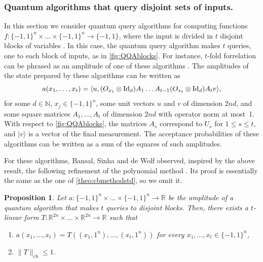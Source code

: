 \documentclass[11pt]{article}
\DeclareMathOperator{\cb}{cb}
\newcommand{\norm}[1]{\|#1\|}
\newcommand{\R}{\mathbb{R}} %
\newcommand{\1}{\mathbf{1}}
\newcommand{\Id}{\ensuremath{\mathop{\rm Id}\nolimits}}
\newcommand{\ket}[1]{|#1\rangle}
\theoremstyle{plain}
\newtheorem{proposition}[theorem]{Proposition}
\theoremstyle{definition}
\theoremstyle{remark}
\begin{document}
\subsubsection{Quantum algorithms that query disjoint sets of inputs.} In this section we consider quantum query algorithms for computing functions $f:\{-1,1\}^n\times\dots\times  \{-1,1\}^n\to \{-1,1\}$, where the input is divided in $t$ disjoint blocks of variables 
. In this case, the quantum query algorithm makes $t$ queries, one to each block of inputs, as in \cref{fig:QQAblocks}. For instance, $t$-fold forrelation can be phrased as an amplitude of one of these algorithms \cite{aaronson2015forrelation}. The amplitudes of the state prepared by these algorithms can be written as
\begin{equation}
    a(x_1,\dots,x_t)=\langle u, (O_{x_1}\otimes \Id_d)A_{1}\dots A_{t-1} (O_{x_t}\otimes \Id_d) A_tv\rangle,
\end{equation}
for some $d\in\mathbb N$, $x_j \in \{-1,1\}^n$, some unit vectors $u$ and $v$ of dimension $2nd$, and some square matrices  $A_1,\dots, A_{t}$ of dimension $2nd$ with operator norm at most~1. With respect to \cref{fig:QQAblocks}, the matrices $A_s$ correspond to $U_s$ for $1\leq s\leq t$, and $\ket v$ is a vector of the final measurement. The acceptance probabilities of these algorithms can be written as a sum of the squares of such amplitudes.




For these algorithms, Bansal, Sinha and de Wolf observed, inspired by the above result, the following refinement of the polynomial method \cite{Bansal:2022}. Its proof is essentially the same as the one of \cref{theo:cbmethodstd}, so we omit it. 

\begin{proposition}\label{prop:cbmethodblock}
    Let $a:\{-1,1\}^n\times\dots\times  \{-1,1\}^n\to \mathbb R$ be the amplitude of a quantum algorithm that makes $t$ queries to disjoint blocks. Then, there exists a $t$-linear form $T:\mathbb R^{2n}\times\dots\times\R^{2n}\to \R$ such that 
    \begin{enumerate}
        \item $a(x_1,\dots,x_t)=T((x_1,1^n),\dots,(x_t,1^n))$ for every $x_1,\dots,x_t\in\{-1,1\}^n$,
        \item $\norm{T}_{\cb}\leq 1$.
    \end{enumerate}

    
\end{proposition}
\end{document}
